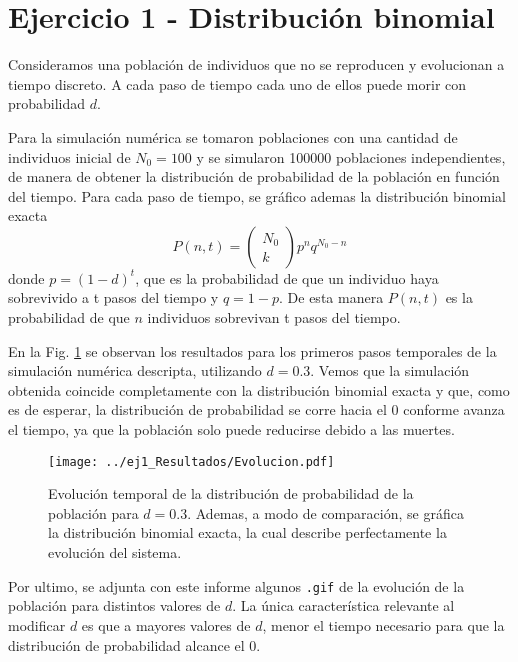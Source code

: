 \section*{Ejercicio 1 - Distribución binomial}

Consideramos una población de individuos que no se reproducen y evolucionan a tiempo discreto. A cada paso de tiempo cada uno de ellos puede morir con probabilidad $d$. 

Para la simulación numérica se tomaron poblaciones con una cantidad de individuos inicial de $N_0=100$ y se simularon 100000 poblaciones independientes, de manera de obtener la distribución de probabilidad de la población en función del tiempo. Para cada paso de tiempo, se gráfico ademas la distribución binomial exacta
\begin{equation}
    P\left(n,t\right) = \begin{pmatrix}
        N_0 \\ k 
    \end{pmatrix} p^n q^{N_0 - n}
\end{equation}
donde $p = (1-d)^t$, que es la probabilidad de que un individuo haya sobrevivido a t pasos del tiempo y $q=1-p$. De esta manera $P\left(n,t\right)$ es la probabilidad de que $n$ individuos sobrevivan t pasos del tiempo.


En la Fig. \ref{ej1:resultado} se observan los resultados para los primeros pasos temporales de la simulación numérica descripta, utilizando $d=0.3$. Vemos que la simulación obtenida coincide completamente con la distribución binomial exacta y que, como es de esperar, la distribución de probabilidad se corre hacia el 0 conforme avanza el tiempo, ya que la población solo puede reducirse debido a las muertes.

\begin{figure}[htb!]
    \centering
    \texttt{[image: ../ej1\_Resultados/Evolucion.pdf]}
    \caption{Evolución temporal de la distribución de probabilidad de la población para $d=0.3$. Ademas, a modo de comparación, se gráfica la distribución binomial exacta, la cual describe perfectamente la evolución del sistema.}
    \label{ej1:resultado}
\end{figure}

Por ultimo, se adjunta con este informe algunos \texttt{.gif} de la evolución de la población para distintos valores de $d$. La única característica relevante al modificar $d$ es que a mayores valores de $d$, menor el tiempo necesario para que la distribución de probabilidad alcance el 0.

